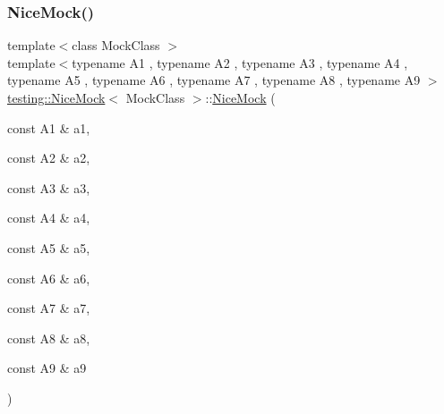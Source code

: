 \mbox{\label{classtesting_1_1_nice_mock_a61cfc9282222928590bcdaf851a806c6}} 
\subsubsection{\texorpdfstring{NiceMock()}{NiceMock()}\hspace{0.1cm}{\footnotesize\ttfamily [16/17]}}
{\footnotesize\ttfamily template$<$class Mock\+Class $>$ \\
template$<$typename A1 , typename A2 , typename A3 , typename A4 , typename A5 , typename A6 , typename A7 , typename A8 , typename A9 $>$ \\
\mbox{\hyperlink{classtesting_1_1_nice_mock}{testing\+::\+Nice\+Mock}}$<$ Mock\+Class $>$\+::\mbox{\hyperlink{classtesting_1_1_nice_mock}{Nice\+Mock}} (\begin{DoxyParamCaption}\item[{const A1 \&}]{a1,  }\item[{const A2 \&}]{a2,  }\item[{const A3 \&}]{a3,  }\item[{const A4 \&}]{a4,  }\item[{const A5 \&}]{a5,  }\item[{const A6 \&}]{a6,  }\item[{const A7 \&}]{a7,  }\item[{const A8 \&}]{a8,  }\item[{const A9 \&}]{a9 }\end{DoxyParamCaption})\hspace{0.3cm}{\ttfamily [inline]}}

\mbox{\label{classtesting_1_1_nice_mock_a4baf1da52f4c892fc02f6ba10c0b8c02}} 
